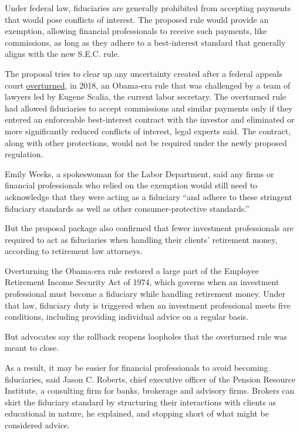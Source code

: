 Under federal law, fiduciaries are generally prohibited from accepting
payments that would pose conflicts of interest. The proposed rule would
provide an exemption, allowing financial professionals to receive such
payments, like commissions, as long as they adhere to a best-interest
standard that generally aligns with the new S.E.C. rule.

The proposal tries to clear up any uncertainty created after a federal
appeals court
\href{https://www.nytimes3xbfgragh.onion/2018/06/22/your-money/fiduciary-rule-dies.html}{overturned},
in 2018, an Obama-era rule that was challenged by a team of lawyers led
by Eugene Scalia, the current labor secretary. The overturned rule had
allowed fiduciaries to accept commissions and similar payments only if
they entered an enforceable best-interest contract with the investor and
eliminated or more significantly reduced conflicts of interest, legal
experts said. The contract, along with other protections, would not be
required under the newly proposed regulation.

Emily Weeks, a spokeswoman for the Labor Department, said any firms or
financial professionals who relied on the exemption would still need to
acknowledge that they were acting as a fiduciary ``and adhere to these
stringent fiduciary standards as well as other consumer-protective
standards.''

But the proposal package also confirmed that fewer investment
professionals are required to act as fiduciaries when handling their
clients' retirement money, according to retirement law attorneys.

Overturning the Obama-era rule restored a large part of the Employee
Retirement Income Security Act of 1974, which governs when an investment
professional must become a fiduciary while handling retirement money.
Under that law, fiduciary duty is triggered when an investment
professional meets five conditions, including providing individual
advice on a regular basis.

But advocates say the rollback reopens loopholes that the overturned
rule was meant to close.

As a result, it may be easier for financial professionals to avoid
becoming fiduciaries, said Jason C. Roberts, chief executive officer of
the Pension Resource Institute, a consulting firm for banks, brokerage
and advisory firms. Brokers can skirt the fiduciary standard by
structuring their interactions with clients as educational in nature, he
explained, and stopping short of what might be considered advice.

